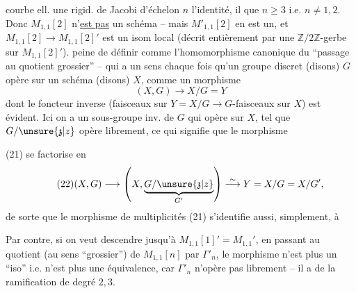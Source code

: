courbe ell.  une rigid. de Jacobi d'échelon $n$  l'identité, il  que $n\geq 3$ i.e. $n\neq 1,2$. Donc $M_{1,1}[2]$ n'\uline{est pas} un schéma -- mais $M'_{1,1}[2]$ en est un, et $M_{1,1}[2]\to M_{1,1}[2]'$ est un  isom local (décrit entièrement par une $\mathbb Z/2\mathbb Z$-gerbe sur $M_{1,1}[2]'$).   peine de définir
comme l'homomorphisme canonique du ``passage au quotient grossier'' -- qui a un sens chaque fois qu'un groupe discret (disons)\unsure{\S} $G$ opère sur un schéma (disons) $X$, comme un morphisme
\[
\tag{21}
(X,G)\longrightarrow X/G=Y
\]
dont le foncteur  inverse (faisceaux sur $Y=X/G\longrightarrow G$-faisceaux sur $X$) est évident. Ici on a un sous-groupe inv.  de $G$ qui opère  sur $X$, tel que $G/\unsure{\mathfrak z|z}$ opère librement, ce qui signifie que le morphisme

(21) se factorise en
\[
\tag{22}
(X,G)\longrightarrow
\left(X,\underbrace{G/\unsure{\mathfrak z|z}}_{G'}\right)
\overset{\sim}{\longrightarrow}Y=X/G=X/G',
\]
de sorte que le morphisme de multiplicités (21) s'identifie aussi, simplement, à

Par contre, si on veut descendre jusqu'à $M_{1,1}[1]'=M_{1,1}'$, en passant au quotient (au sens ``grossier'') de $M_{1,1}[n]$ par $\Gamma'_n$, le morphisme
n'est plus un ``iso'' i.e. n'est plus une équivalence, car $\Gamma'_n$ n'opère pas librement -- il a  de la ramification de degré $2,3$.

